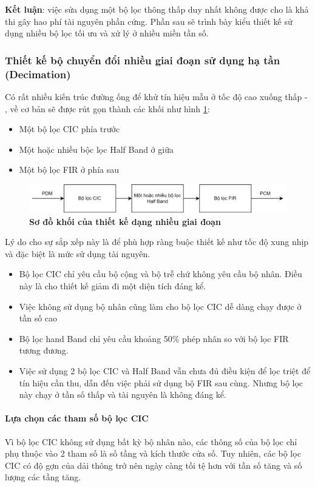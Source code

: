 \textbf{Kết luận}: việc sửa dụng một bộ lọc thông thấp duy nhất không được cho là khả thi gây hao phí tài nguyên phần cứng. Phần sau sẽ trình bày kiểu thiết kế sử dụng nhiều bộ lọc tối ưu và xử lý ở nhiều miền tần số.

\subsubsection{Thiết kế bộ chuyển đổi nhiều giai đoạn sử dụng hạ tần (Decimation)}
Có rất nhiều kiến trúc đường ống để khử tín hiệu mẫu ở tốc độ cao xuống thấp \cite{pipelie1} - \cite{pipelie2}, về cơ bản sẽ được rút gọn thành các khối như hình \ref{pipeline_top}:
\begin{itemize}
    \item Một bộ lọc CIC phía trước
    \item Một hoặc nhiều bộc lọc Half Band ở giữa
    \item Một bộ lọc FIR ở phía sau
\end{itemize}

\begin{figure}[H]
    \centering
    \includegraphics[width=15cm]{Images/Chuong3/pipeline_top.png}
    \caption[Sơ đồ khối của thiết kế dạng nhiều giai đoạn]{\bfseries \fontsize{12pt}{0pt}\selectfont Sơ đồ khối của thiết kế dạng nhiều giai đoạn}
    \label{pipeline_top}
\end{figure}
Lý do cho sự sắp xếp này là để phù hợp ràng buộc thiết kế như tốc độ xung nhịp và đặc biệt là mức sử dụng tài nguyên.
\begin{itemize}
    \item Bộ lọc CIC chỉ yêu cầu bộ cộng và bộ trễ chứ không yêu cầu bộ nhân. Điều này là cho thiết kế giảm đi một diện tích đáng kể.
    \item Việc không sử dụng bộ nhân cũng làm cho bộ lọc CIC dễ dàng chạy được ở tần số cao
    \item Bộ lọc hand Band chỉ yêu cầu khoảng 50\% phép nhân so với bộ lọc FIR tương đương.
    \item Việc sử dụng 2 bộ lọc CIC và Half Band vẫn chưa đủ điều kiện để lọc triệt để tín hiệu cần thu, dẫn đến việc phải sử dụng bộ FIR sau cùng. Nhưng bộ lọc này chạy ở tần số thấp và tài nguyên là không đáng kể.
\end{itemize}
\paragraph{Lựa chọn các tham số bộ lọc CIC}
Vì bộ lọc CIC không sử dụng bất kỳ bộ nhân nào, các thông số của bộ lọc chỉ phụ thuộc vào 2 tham số là số tầng và kích thước cửa số. Tuy nhiên, các bộ lọc CIC có độ gợn của dải thông trở nên ngày càng tồi tệ hơn với tần số tăng và số lượng các tầng tăng.

